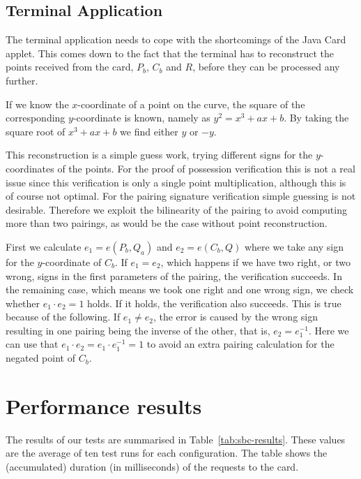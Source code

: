 \subsection{Terminal Application}

The terminal application needs to cope with the shortcomings of the Java Card
applet. This comes down to the fact that the terminal has to reconstruct the
points received from the card, $P_b$, $C_b$ and $R$, before they can be
processed any further.

If we know the $x$-coordinate of a point on the curve, the square of the
corresponding $y$-coordinate is known, namely as $y^{2} = x^{3} + ax + b$.
By taking the square root of $x^{3} + ax + b$ we find either $y$ or $-y$.

This reconstruction is a simple guess work, trying different signs for the
$y$-coordinates of the points. For the proof of possession verification this is
not a real issue since this verification is only a single point multiplication,
although this is of course not optimal. For the pairing signature verification
simple guessing is not desirable. Therefore we exploit the bilinearity of the
pairing to avoid computing more than two pairings, as would be the case without
point reconstruction.

First we calculate $e_1 = e(P_b, Q_a)$ and $e_2 = e(C_b, Q)$ where we take any
sign for the $y$-coordinate of $C_b$. If $e_1 = e_2$, which happens if we have
two right, or two wrong, signs in the first parameters of the pairing, the
verification succeeds. In the remaining case, which means we took one right and
one wrong sign, we check whether $e_1 \cdot e_2 = 1$ holds. If it holds, the
verification also succeeds. This is true because of the following. If
$e_1 \neq e_2$, the error is caused by the wrong sign resulting in one pairing
being the inverse of the other, that is, $e_2 = e_1^{-1}$. Here we can use that
$e_1 \cdot e_2 = e_1 \cdot e_1^{-1} = 1$ to avoid an extra pairing calculation
for the negated point of $C_b$.

\section{Performance results}

The results of our tests are summarised in Table~\ref{tab:sbc-results}. These
values are the average of ten test runs for each configuration. The table shows
the (accumulated) duration (in milliseconds) of the requests to the card.

